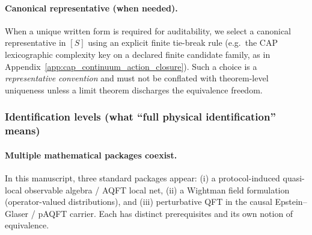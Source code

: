 \paragraph{Canonical representative (when needed).}
\AuditTag When a unique written form is required for auditability, we select a canonical representative in $[S]$ using an explicit finite tie-break rule (e.g.\ the CAP lexicographic complexity key on a declared finite candidate family, as in Appendix~\ref{app:cap_continuum_action_closure}).
Such a choice is a \emph{representative convention} and must not be conflated with theorem-level uniqueness unless a limit theorem discharges the equivalence freedom.

\subsubsection{Identification levels (what ``full physical identification'' means)}
\paragraph{Multiple mathematical packages coexist.}
\AuditTag In this manuscript, three standard packages appear: (i) a protocol-induced quasi-local observable algebra / AQFT local net, (ii) a Wightman field formulation (operator-valued distributions), and (iii) perturbative QFT in the causal Epstein--Glaser / pAQFT carrier.
Each has distinct prerequisites and its own notion of equivalence.

